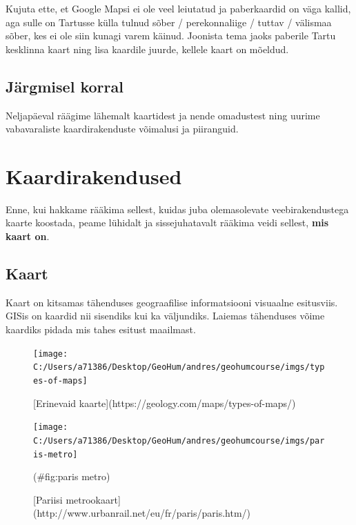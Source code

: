 \documentclass[
]{book}
\begin{document}
Kujuta ette, et Google Mapsi ei ole veel leiutatud ja paberkaardid on väga kallid, aga sulle on Tartusse külla tulnud sõber / perekonnaliige / tuttav / välismaa sõber, kes ei ole siin kunagi varem käinud. Joonista tema jaoks paberile Tartu kesklinna kaart ning lisa kaardile juurde, kellele kaart on mõeldud.

\hypertarget{juxe4rgmisel-korral-1}{%
\section{Järgmisel korral}\label{juxe4rgmisel-korral-1}}

Neljapäeval räägime lähemalt kaartidest ja nende omadustest ning uurime vabavaraliste kaardirakenduste võimalusi ja piiranguid.

\hypertarget{kaardirakendused}{%
\chapter{Kaardirakendused}\label{kaardirakendused}}

Enne, kui hakkame rääkima sellest, kuidas juba olemasolevate veebirakendustega kaarte koostada, peame lühidalt ja sissejuhatavalt rääkima veidi sellest, \textbf{mis kaart on}.

\hypertarget{kaart}{%
\section{Kaart}\label{kaart}}

Kaart on kitsamas tähenduses geograafilise informatsiooni visuaalne esitusviis. GISis on kaardid nii sisendiks kui ka väljundiks. Laiemas tähenduses võime kaardiks pidada mis tahes esitust maailmast.

\begin{figure}

{\centering \texttt{[image: C:/Users/a71386/Desktop/GeoHum/andres/geohumcourse/imgs/types-of-maps]} 

}

\caption{[Erinevaid kaarte](https://geology.com/maps/types-of-maps/)}\label{fig:map-types}
\end{figure}

\begin{figure}

{\centering \texttt{[image: C:/Users/a71386/Desktop/GeoHum/andres/geohumcourse/imgs/paris-metro]} 

}

\caption{[Pariisi metrookaart](http://www.urbanrail.net/eu/fr/paris/paris.htm/)}(\#fig:paris metro)
\end{figure}
\end{document}
